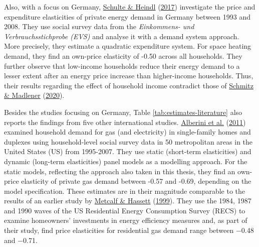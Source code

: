 \documentclass[12pt,twoside]{reedthesis}
\begin{document}
Also, with a focus on Germany, \protect\hyperlink{ref-schulte_heindl17}{Schulte \& Heindl} (\protect\hyperlink{ref-schulte_heindl17}{2017}) investigate the price and expenditure elasticities of private energy demand in Germany between 1993 and 2008. They use social survey data from the \emph{Einkommens- und Verbrauchsstichprobe (EVS)} and analyse it with a demand system approach. More precisely, they estimate a quadratic expenditure system. For space heating demand, they find an own-price elasticity of -0.50 across all households. They further observe that low-income households reduce their energy demand to a lesser extent after an energy price increase than higher-income households. Thus, their results regarding the effect of household income contradict those of \protect\hyperlink{ref-schmitz_madlener20}{Schmitz \& Madlener} (\protect\hyperlink{ref-schmitz_madlener20}{2020}).

Besides the studies focusing on Germany, Table \ref{tab:estimates-literature} also reports the findings from five other international studies. \protect\hyperlink{ref-alberini_etal11}{Alberini et al.} (\protect\hyperlink{ref-alberini_etal11}{2011}) examined household demand for gas (and electricity) in single-family homes and duplexes using household-level social survey data in 50 metropolitan areas in the United States (US) from 1995-2007. They use static (short-term elasticities) and dynamic (long-term elasticities) panel models as a modelling approach. For the static models, reflecting the approach also taken in this thesis, they find an own-price elasticity of private gas demand between -0.57 and -0.69, depending on the model specification. These estimates are in their magnitude comparable to the results of an earlier study by \protect\hyperlink{ref-metcalf_hassett99}{Metcalf \& Hassett} (\protect\hyperlink{ref-metcalf_hassett99}{1999}). They use the 1984, 1987 and 1990 waves of the US Residential Energy Consumption Survey (RECS) to examine homeowners' investments in energy efficiency measures and, as part of their study, find price elasticities for residential gas demand range between −0.48 and −0.71.
\end{document}
